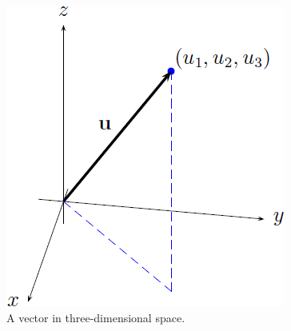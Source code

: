 \begin{figure}[!htpb]
\centering
\includegraphics[scale=0.8]{images/vector-3d}
\caption{A vector in three-dimensional space.}
\label{fig:vectors_matrices:3D_vector}
\end{figure}



